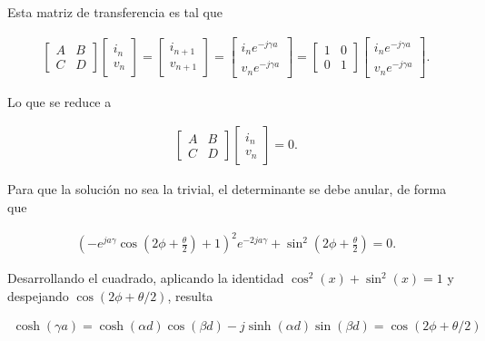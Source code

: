 Esta matriz de transferencia es tal que 

\begin{align}
\begin{bmatrix}
A & B \\
C & D
\end{bmatrix}
\begin{bmatrix}
i_n \\
v_n
\end{bmatrix}
=
\begin{bmatrix}
i_{n+1} \\
v_{n+1}
\end{bmatrix}
	=
\begin{bmatrix}
i_n e^{-j\gamma a} \\
v_n e^{-j\gamma a}
\end{bmatrix}
=
\begin{bmatrix}
1 & 0 \\
0 & 1
\end{bmatrix}
\begin{bmatrix}
i_n e^{-j\gamma a} \\
v_n e^{-j\gamma a}
\end{bmatrix}.
\end{align}

Lo que se reduce a

\begin{align}
\begin{bmatrix}
A & B \\
C & D
\end{bmatrix}
\begin{bmatrix}
i_n \\
v_n
\end{bmatrix}
=0.
\end{align}

Para que la solución no sea la trivial, el determinante se debe anular, de forma que

\begin{align}
	\left(- e^{j a \gamma} \cos{\left (2 \phi + \frac{\theta}{2} \right )} + 1\right)^{2} e^{- 2 j a \gamma} + \sin^{2}{\left (2 \phi + \frac{\theta}{2} \right )} = 0.
\end{align}

Desarrollando el cuadrado, aplicando la identidad $\cos^2(x)+\sin^2(x)=1$ y despejando $\cos(2\phi+\theta/2)$, resulta

\begin{align}
	\cosh(\gamma a) = \cosh(\alpha d)\cos(\beta d) -j \sinh(\alpha d) \sin(\beta d) = \cos(2\phi+\theta/2)
\end{align}

